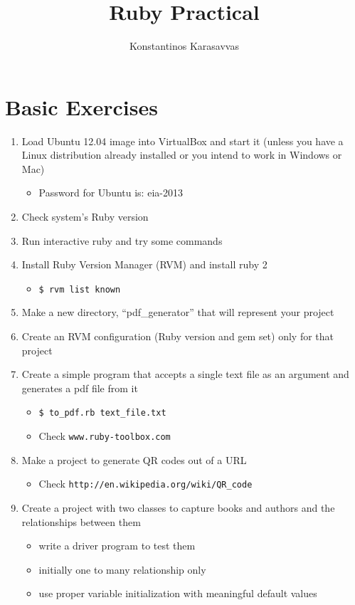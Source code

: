 \documentclass[14pt,a4paper]{article}
\author{Konstantinos Karasavvas}
\title{Ruby Practical}
\begin{document}
\maketitle

\section{Basic Exercises}
\begin{enumerate}
  \item Load Ubuntu 12.04 image into VirtualBox and start it (unless you have a Linux distribution already installed or you intend to work in Windows or Mac)
  \begin{itemize}
    \item Password for Ubuntu is: eia-2013
  \end{itemize}
  \item Check system's Ruby version
  \item Run interactive ruby and try some commands
  \item Install Ruby Version Manager (RVM) and install ruby 2
  \begin{itemize}
    \item \texttt{\$ rvm list known}
  \end{itemize}  
  \item Make a new directory, ``pdf\_generator'' that will represent your project
  \item Create an RVM configuration (Ruby version and gem set) only for that project
  \item Create a simple program that accepts a single text file as an argument and generates a pdf file from it
  \begin{itemize}
    \item \texttt{\$ to\_pdf.rb text\_file.txt}
    \item Check \texttt{www.ruby-toolbox.com}
  \end{itemize}  
  \item Make a project to generate QR codes out of a URL
  \begin{itemize}
    \item Check \texttt{http://en.wikipedia.org/wiki/QR\_code}
  \end{itemize}  

  \item Create a project with two classes to capture books and authors and the relationships between them
  \begin{itemize}
    \item write a driver program to test them
    \item initially one to many relationship only
    \item use proper variable initialization with meaningful default values
  \end{itemize}  


\end{enumerate}
\end{document}
